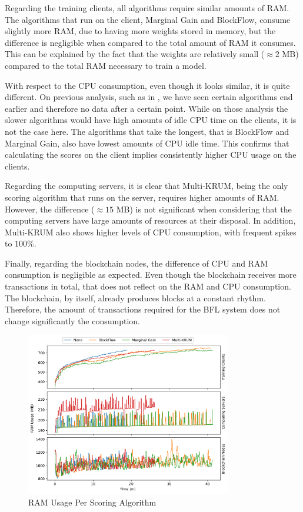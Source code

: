 Regarding the training clients, all algorithms require similar amounts of RAM. The algorithms that run on the client, Marginal Gain and BlockFlow, consume slightly more RAM, due to having more weights stored in memory, but the difference is negligible when compared to the total amount of RAM it consumes. This can be explained by the fact that the weights are relatively small ($\approx 2$ MB) compared to the total RAM necessary to train a model.

With respect to the CPU consumption, even though it looks similar, it is quite different. On previous analysis, such as in , we have seen certain algorithms end earlier and therefore no data after a certain point. While on those analysis the slower algorithms would have high amounts of idle CPU time on the clients, it is not the case here. The algorithms that take the longest, that is BlockFlow and Marginal Gain, also have lowest amounts of CPU idle time. This confirms that calculating the scores on the client implies consistently higher CPU usage on the clients.

Regarding the computing servers, it is clear that Multi-KRUM, being the only scoring algorithm that runs on the server, requires higher amounts of RAM. However, the difference ($\approx 15$ MB) is not significant when considering that the computing servers have large amounts of resources at their disposal. In addition, Multi-KRUM also shows higher levels of CPU consumption, with frequent spikes to $100\%$.

Finally, regarding the blockchain nodes, the difference of CPU and RAM consumption is negligible as expected. Even though the blockchain receives more transactions in total, that does not reflect on the RAM and CPU consumption. The blockchain, by itself, already produces blocks at a constant rhythm. Therefore, the amount of transactions required for the BFL system does not change significantly the consumption.

\begin{figure}[!hpt]
    \centering
    \centering
    \includegraphics[width=0.8\textwidth]{graphics/scoring/ram.pdf}
    \caption{RAM Usage Per Scoring Algorithm}
    \label{fig:ram_scoring}
\end{figure}

